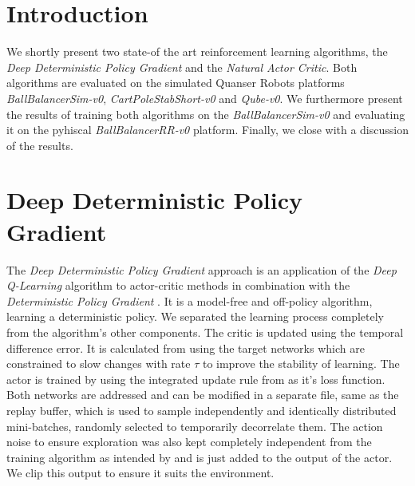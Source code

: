 
\author{Yannik P. Frisch \and Tabea A. Wilke \and Maximilian A. Gehrke %
}


\maketitle

\section{Introduction}
\label{sec:intro}
We shortly present two state-of the art reinforcement learning algorithms, the 
\textit{Deep Deterministic Policy Gradient} and the \textit{Natural Actor 
Critic}. Both algorithms are evaluated on the simulated Quanser Robots 
platforms \textit{BallBalancerSim-v0}, \textit{CartPoleStabShort-v0} and 
\textit{Qube-v0}. We furthermore present the results of training both 
algorithms on the \textit{BallBalancerSim-v0} and evaluating it on the pyhiscal 
\textit{BallBalancerRR-v0} platform. Finally, we close with a discussion of the 
results.
\newpage
\section{Deep Deterministic Policy Gradient}
\label{sec:ddpg}
The \textit{Deep Deterministic Policy Gradient} approach 
\citep{lillicrap2015continuous} is an application of the \textit{Deep 
Q-Learning} algorithm \citep{mnih2013playing} to actor-critic methods 
\citep{konda2000actor} in combination with the \textit{Deterministic Policy 
Gradient} \citep{silver2014deterministic}. It is a model-free and off-policy 
algorithm, learning a deterministic policy. We separated the learning process 
completely from the algorithm's other components. The critic is updated using 
the temporal difference error. It is calculated from using the target networks 
which are constrained to slow changes with rate $\tau$ to improve the stability 
of learning. The actor is trained by using the integrated update rule from 
\cite{lillicrap2015continuous} as it's loss function. Both networks are 
addressed and can be modified in a separate file, same as the replay buffer, 
which is used to sample independently and identically distributed mini-batches, 
randomly selected to temporarily decorrelate them. The action noise to ensure 
exploration was also kept completely independent from the training algorithm as 
intended by \citep{lillicrap2015continuous} and is just added to the output of 
the actor. We clip this output to ensure it suits the environment.


